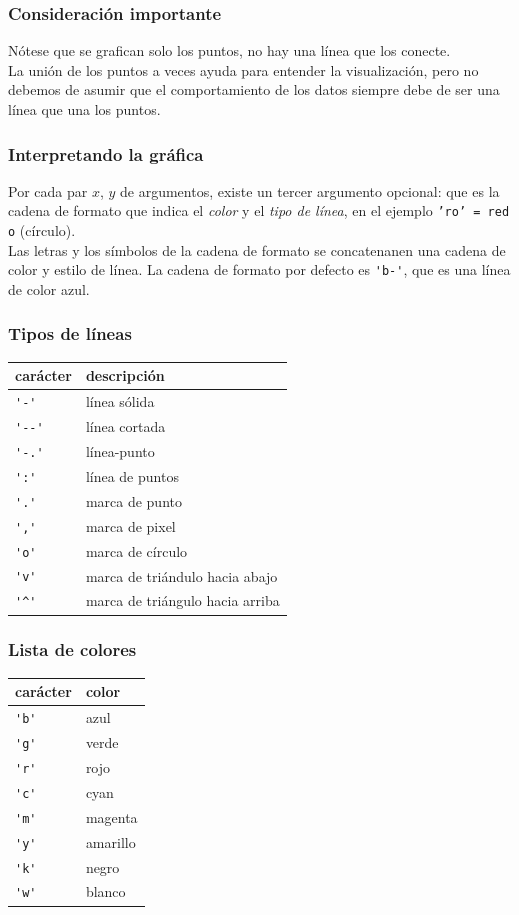 \documentclass[12pt]{beamer}
\begin{document}
\begin{frame}
\frametitle{Consideración importante}
Nótese que se grafican solo los puntos, \pause no hay una línea que los conecte.
\\
\bigskip
\pause
La unión de los puntos a veces ayuda para entender la visualización, pero no debemos de asumir que el comportamiento de los datos siempre debe de ser una línea que una los puntos.
\end{frame}
\begin{frame}[fragile]
\frametitle{Interpretando la gráfica}
Por cada par $x$, $y$ de argumentos, existe un tercer argumento opcional: que es la cadena de formato que indica el \emph{color} y el \emph{tipo de línea}, en el ejemplo \texttt{'ro' = red o} (círculo).
\\
\medskip
\pause
Las letras y los símbolos de la cadena de formato se concatenanen una cadena de color y estilo de línea. \pause La cadena de formato por defecto es \verb|'b-'|, que es una línea de color azul.
\end{frame}
\begin{frame}[fragile]
\frametitle{Tipos de líneas}
\renewcommand{\arraystretch}{0.9}
\begin{tabular}{l | l}
carácter & descripción \\ \hline
\verb|'-'|	& línea sólida \\ \hline
\verb|'--'| & línea cortada \\ \hline
\verb|'-.'| & línea-punto \\ \hline
\verb|':'|	& línea de puntos \\ \hline
\verb|'.'|	& marca de punto \\ \hline
\verb|','|	& marca de pixel \\ \hline
\verb|'o'|	& marca de círculo \\ \hline
\verb|'v'|	& marca de triándulo hacia abajo \\ \hline
\verb|'^'|	& marca de triángulo hacia arriba
\end{tabular}
\end{frame}
\begin{frame}[fragile]
\frametitle{Lista de colores}
\renewcommand{\arraystretch}{0.8}
\begin{tabular}{l | l}
carácter & color \\ \hline
\verb|'b'| & azul \\ \hline
\verb|'g'| & verde \\ \hline
\verb|'r'| & rojo \\ \hline
\verb|'c'| & cyan \\ \hline
\verb|'m'| & magenta \\ \hline
\verb|'y'| & amarillo \\ \hline
\verb|'k'| & negro \\ \hline
\verb|'w'| & blanco
\end{tabular}
\end{frame}
\end{document}
